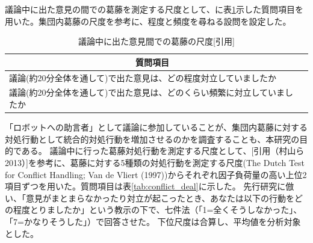 \documentclass[11pt, a4paper]{jreport} %
\begin{document}
議論中に出た意見の間での葛藤を測定する尺度として、に表\ref{tab:conflict2}示した質問項目を用いた。集団内葛藤の尺度を参考に、程度と頻度を尋ねる設問を設定した。
\begin{table}[H]
\centering
\caption{議論中に出た意見間での葛藤の尺度{[}引用{]}}
\label{tab:conflict2}
\begin{tabular}{@{}ll@{}}
\toprule
\multicolumn{1}{c}{質問項目}              \\ \midrule
議論(約20分全体を通して)で出た意見は、どの程度対立していましたか                    \\
議論(約20分全体を通して)で出た意見は、どのくらい頻繁に対立していましたか \\ \bottomrule
\end{tabular}
\end{table}



「ロボットへの助言者」として議論に参加していることが、集団内葛藤に対する対処行動として統合的対処行動を増加させるのかを調査することも、本研究の目的である。
議論中に行った葛藤対処行動を測定する尺度として、[引用（村山ら2013）]を参考に、葛藤に対する5種類の対処行動を測定する尺度(The Dutch Test for Conflict Handling; Van de Vliert (1997))からそれぞれ因子負荷量の高い上位2項目ずつを用いた。質問項目は表\ref{tab:conflict_deal}に示した。
先行研究に倣い、「意見がまとまらなかったり対立が起こったとき、あなたは以下の行動をどの程度とりましたか」という教示の下で、七件法（「1=全くそうしなかった」、「7=かなりそうした」）で回答させた。
下位尺度は合算し、平均値を分析対象とした。
\end{document}
